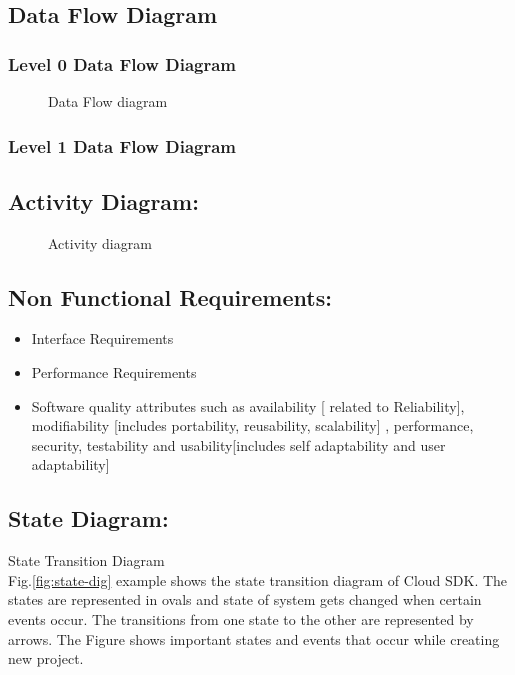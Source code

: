 \documentclass[oneside,a4paper,12pt]{book}
\begin{document}
\subsection{Data Flow Diagram}  
\subsubsection{Level 0 Data Flow Diagram}
\begin{center}
	\begin{figure}[!htbp]
		\centering
	  \caption{Data Flow diagram}
	  \label{fig:usecase}
	\end{figure}
\end{center}
\subsubsection{Level 1 Data Flow Diagram}
 



 
\subsection{Activity Diagram:}
 \begin{center}
	\begin{figure}[!htbp]
		\centering
	  \caption{Activity diagram}
	  \label{fig:usecase}
	\end{figure}
\end{center}

\newpage
\subsection{Non Functional Requirements:}
\begin{itemize}
	\item	Interface Requirements
	\item	Performance Requirements
    \item	Software quality attributes such as availability [ related to Reliability], modifiability [includes portability, reusability, scalability] ,  		performance, security, testability and usability[includes self 			adaptability and user adaptability] 
\end{itemize} 

\subsection{State Diagram:}	
  State Transition Diagram\\
Fig.\ref{fig:state-dig} example shows the state transition diagram of Cloud SDK. The states are
represented in ovals and state of system gets changed when certain events occur. The transitions from one state to the other are represented by arrows. The Figure    shows important states and events that occur while creating new project.
\end{document}
